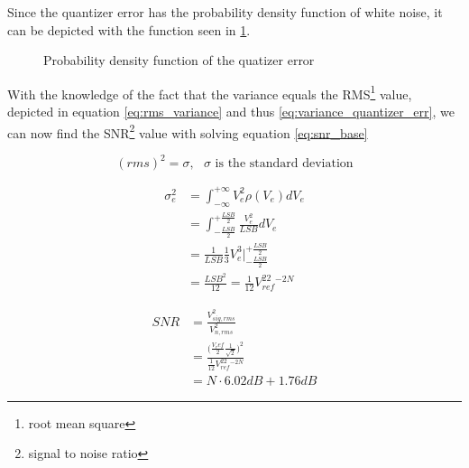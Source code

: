 \documentclass[10pt,landscape]{article}
\begin{document}
\begin{multicols}{2}
Since the quantizer error has the probability density function of white noise, it can be depicted with the function seen in \ref{fig:prob_dens_func_quantizer}.

\begin{figure}[H]
    \centering
    \caption{Probability density function of the quatizer error}
    \label{fig:prob_dens_func_quantizer}
\end{figure}

With the knowledge of the fact that the variance equals the RMS\footnote{root mean square} value, depicted in equation \ref{eq:rms_variance} and thus \ref{eq:variance_quantizer_err}, we can now find the SNR\footnote{signal to noise ratio} value with solving equation \ref{eq:snr_base}

\begin{equation}
    (rms)^2 = \sigma,\text{ $\sigma$ is the standard deviation}
    \label{eq:rms_variance}
\end{equation}

\begin{align}
    \sigma_e^2 &= \int_{-\infty}^{+\infty}V_e^2\rho(V_e)dV_e \\
    &= \int_{-\frac{LSB}{2}}^{+\frac{LSB}{2}}\frac{V_e^2}{LSB}dV_e \\
    &= \frac{1}{LSB}\frac{1}{3}V_e^3\Big|_{-\frac{LSB}{2}}^{+\frac{LSB}{2}} \\
    &= \frac{LSB^2}{12} = \frac{1}{12}V_{ref}^22^{-2N}
    \label{eq:variance_quantizer_err}
\end{align}

\begin{align}
    SNR &= \frac{V_{sig, rms}^2}{V_{n, rms}^2} \\
    &= \frac{\Big(\frac{V_ref}{2}\frac{1}{\sqrt{2}}\Big)^2}{\frac{1}{12}V_{ref}^22^{-2N}} \\
    &= N\cdot 6.02dB + 1.76dB
    \label{eq:snr_base}
\end{align}


\end{multicols}
\end{document}
